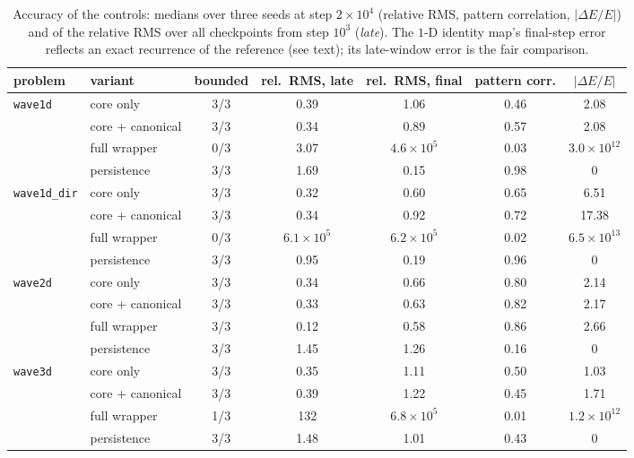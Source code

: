 \documentclass[11pt]{article}
\theoremstyle{definition}
\theoremstyle{remark}
\begin{document}
\begin{table}[htbp]
\centering
\caption{Accuracy of the controls: medians over three seeds at step
$2\times10^{4}$ (relative RMS, pattern correlation, $|\Delta E/E|$) and of the
relative RMS over all checkpoints from step $10^{3}$ (\emph{late}). The $1$-D
identity map's final-step error reflects an exact recurrence of the reference
(see text); its late-window error is the fair comparison.}
\label{tab:controls}
\small
\begin{tabular}{@{}llccccc@{}}
\toprule
problem & variant & bounded & rel.\ RMS, late & rel.\ RMS, final & pattern corr. & $|\Delta E/E|$ \\
\midrule
\texttt{wave1d} & core only & 3/3 & 0.39 & 1.06 & 0.46 & 2.08 \\
 & core + canonical & 3/3 & 0.34 & 0.89 & 0.57 & 2.08 \\
 & full wrapper & 0/3 & 3.07 & $4.6\times10^{5}$ & 0.03 & $3.0\times10^{12}$ \\
 & persistence & 3/3 & 1.69 & 0.15 & 0.98 & 0 \\
\midrule
\texttt{wave1d\_dir} & core only & 3/3 & 0.32 & 0.60 & 0.65 & 6.51 \\
 & core + canonical & 3/3 & 0.34 & 0.92 & 0.72 & 17.38 \\
 & full wrapper & 0/3 & $6.1\times10^{5}$ & $6.2\times10^{5}$ & 0.02 & $6.5\times10^{13}$ \\
 & persistence & 3/3 & 0.95 & 0.19 & 0.96 & 0 \\
\midrule
\texttt{wave2d} & core only & 3/3 & 0.34 & 0.66 & 0.80 & 2.14 \\
 & core + canonical & 3/3 & 0.33 & 0.63 & 0.82 & 2.17 \\
 & full wrapper & 3/3 & 0.12 & 0.58 & 0.86 & 2.66 \\
 & persistence & 3/3 & 1.45 & 1.26 & 0.16 & 0 \\
\midrule
\texttt{wave3d} & core only & 3/3 & 0.35 & 1.11 & 0.50 & 1.03 \\
 & core + canonical & 3/3 & 0.39 & 1.22 & 0.45 & 1.71 \\
 & full wrapper & 1/3 & 132 & $6.8\times10^{5}$ & 0.01 & $1.2\times10^{12}$ \\
 & persistence & 3/3 & 1.48 & 1.01 & 0.43 & 0 \\
\bottomrule
\end{tabular}
\end{table}
\end{document}

